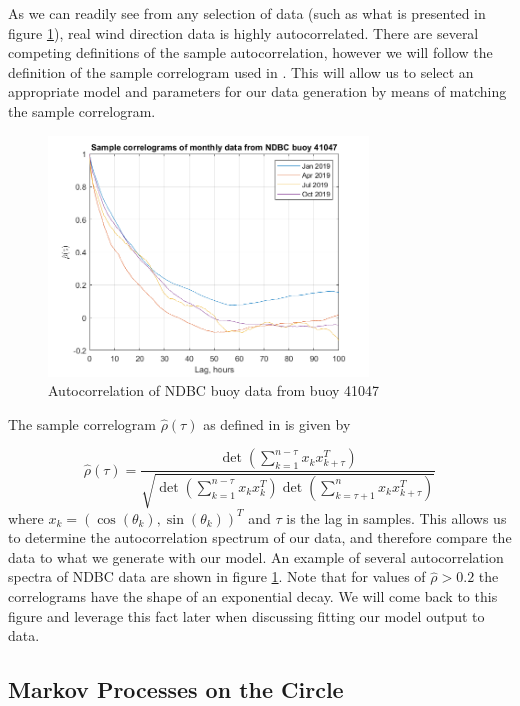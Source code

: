 \documentclass[12pt]{article}
\numberwithin{equation}{section}
\numberwithin{figure}{section}
\begin{document}
As we can readily see from any selection of data (such as what is presented in figure \ref{fig:ex ac}), real wind direction data is highly autocorrelated. There are several competing definitions of the sample autocorrelation, however we will follow the definition of the sample correlogram used in \cite{fisher}. This will allow us to select an appropriate model and parameters for our data generation by means of matching the sample correlogram.

\begin{figure}[h]
\centering
\includegraphics[width=85mm]{New Folder/example correlograms.png}
\caption{Autocorrelation of NDBC buoy data from buoy 41047}\label{fig:ex ac}
\end{figure}

The sample correlogram $\hat{\rho}(\tau)$ as defined in \cite{fisher} is given by 

\begin{equation}\label{eq:sample ac}
\hat{\rho}(\tau) = \frac{\det\left(\sum_{k=1}^{n-\tau}x_k x_{k+\tau}^T \right)}{\sqrt{\det\left(\sum_{k=1}^{n-\tau}x_k x_{k}^T \right)\det\left(\sum_{k=\tau+1}^{n}x_k x_{k+\tau}^T \right)}}
\end{equation}
where $x_k = \left(\cos(\theta_k),\sin(\theta_k)\right)^T$ and $\tau$ is the lag in samples. This allows us to determine the autocorrelation spectrum of our data, and therefore compare the data to what we generate with our model. An example of several autocorrelation spectra of NDBC data are shown in figure \ref{fig:ex ac}. Note that for values of $\hat{\rho}>0.2$ the correlograms have the shape of an exponential decay. We will come back to this figure and leverage this fact later when discussing fitting our model output to data.

\subsection{Markov Processes on the Circle }
\end{document}
